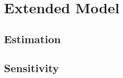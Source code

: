 \section{Extended Model}
\label{sec:extended_model}

\subsection{Estimation}
\label{sec:estimation}


\begin{table}
  \centering
  \caption{Table 3 - Parameterization}
  \label{tab:estimation}
\end{table}

\subsection{Sensitivity}
\label{sec:sensitivity}



